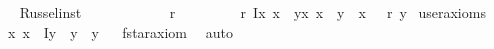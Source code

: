 \begin{isabellebody}
\isatagproof
{}\isamarkupfalse%
%
\endisatagproof
{\isafoldproof}%
%
\isadelimproof
%
\endisadelimproof
\isanewline
\isanewline
\isanewline
\ \isanewline
{}\isamarkupfalse%
\ Russel{\isacharunderscore}inst\ {\isacharcolon}\ \isanewline
\ {\isachardoublequoteopen}{\isacharparenleft}{\isacharparenleft}{\isasymOtimes}\ \isactrlbold {\isacharequal}\ {\isasymalpha}\ \isactrlbold {\isasymor}\ {\isasymOtimes}\ \isactrlbold {\isacharequal}\ {\isasymbeta}{\isacharparenright}\ \isactrlbold {\isasymrightarrow}\ \isactrlbold {\isasymnot}{\isacharparenleft}{\isasymalpha}\ \isactrlbold r\ {\isasymbeta}{\isacharparenright}{\isacharparenright}\ \isanewline
\ \ \isactrlbold {\isasymrightarrow}\ \isanewline
\ \ {\isacharparenleft}{\isacharparenleft}{\isasymalpha}\ \isactrlbold r\ {\isacharparenleft}\isactrlbold Ix{\isachardot}\ {\isasymPhi}{\isacharparenleft}x{\isacharparenright}{\isacharparenright}{\isacharparenright}\ \isactrlbold {\isasymleftrightarrow}\ {\isacharparenleft}\isactrlbold {\isasymexists}y{\isachardot}{\isacharparenleft}{\isacharparenleft}\isactrlbold {\isasymforall}x{\isachardot}\ {\isacharparenleft}{\isacharparenleft}x\ \isactrlbold {\isacharequal}\ y{\isacharparenright}\ \isactrlbold {\isasymleftrightarrow}\ {\isasymPhi}{\isacharparenleft}x{\isacharparenright}{\isacharparenright}{\isacharparenright}\ \isactrlbold {\isasymand}\ {\isacharparenleft}{\isasymalpha}\ \isactrlbold r\ y{\isacharparenright}{\isacharparenright}{\isacharparenright}{\isacharparenright}{\isachardoublequoteclose}\isanewline
{}\isamarkupfalse%
\ {\isacharbrackleft}user{\isacharunderscore}axioms{\isacharbrackright}%
\isadelimproof
\ %
\endisadelimproof
%
\isatagproof
{}\isamarkupfalse%
%
\endisatagproof
{\isafoldproof}%
%
\isadelimproof
%
\endisadelimproof
\isanewline
\isanewline
\isanewline
\isanewline
\isanewline
{}\isamarkupfalse%
\ {\isachardoublequoteopen}\isactrlbold {\isasymnot}{\isacharparenleft}\isactrlbold {\isasymexists}x{\isachardot}\ {\isacharparenleft}x\ \isactrlbold {\isacharequal}\ {\isacharparenleft}\isactrlbold Iy{\isachardot}\ \isactrlbold {\isasymnot}\ {\isacharparenleft}y\ \isactrlbold {\isacharequal}\ y{\isacharparenright}{\isacharparenright}{\isacharparenright}{\isacharparenright}{\isachardoublequoteclose}%
\isadelimproof
\ %
\endisadelimproof
%
\isatagproof
{}\isamarkupfalse%
\ f{\isacharunderscore}star{\isacharunderscore}axiom\ \isamarkupfalse%
\ auto%
\endisatagproof
{\isafoldproof}%
%
\isadelimproof
%
\endisadelimproof
\isanewline
{}\isamarkupfalse%

\end{isabellebody}

